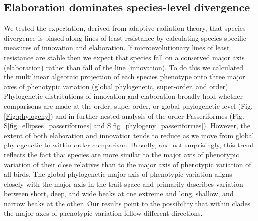 \documentclass[12pt,letterpaper]{article}
\begin{document}
\subsection{Elaboration dominates species-level divergence}
We tested the expectation, derived from adaptive radiation theory, that species divergence is biased along lines of least resistance by calculating species-specific measures of innovation and elaboration.
If microevolutionary lines of least resistance are stable then we expect that species fall on a conserved major axis (elaboration) rather than fall of the line (innovation).
To do this we calculated the multilinear algebraic projection of each species phenotype onto three major axes of phenotypic variation (global phylogenetic, super-order, and order).
Phylogenetic distributions of innovation and elaboration broadly hold whether comparisons are made at the order, super-order, or global phylogenetic level (Fig. \ref{Fig:phylogeny})%
 and in further nested analysis of the order Passeriformes (Fig. S\ref{fig_ellipses_passeriformes} and S\ref{fig_phylogeny_passeriformes}).
However, the extent of both elaboration and innovation tends to reduce as we move from global phylogenetic to within-order comparison.
Broadly, and not surprisingly, this trend reflects the fact that species are more similar to the major axis of phenotypic variation of their close relatives than to the major axis of phenotypic variation of all birds.
The global phylogenetic major axis of phenotypic variation aligns closely with the major axis in the trait space and primarily describes variation between short, deep, and wide beaks at one extreme and long, shallow, and narrow beaks at the other.
Our results point to the possibility that within clades the major axes of phenotypic variation follow different directions. 
\end{document}
